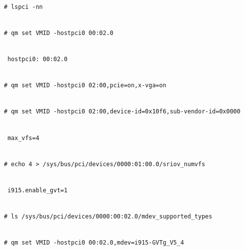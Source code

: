 \begin{lstlisting}

# lspci -nn

\end{lstlisting}

\begin{lstlisting}

# qm set VMID -hostpci0 00:02.0

\end{lstlisting}

\begin{lstlisting}

 hostpci0: 00:02.0

\end{lstlisting}

\begin{lstlisting}

# qm set VMID -hostpci0 02:00,pcie=on,x-vga=on

\end{lstlisting}

\begin{lstlisting}

# qm set VMID -hostpci0 02:00,device-id=0x10f6,sub-vendor-id=0x0000

\end{lstlisting}

\begin{lstlisting}

 max_vfs=4

\end{lstlisting}

\begin{lstlisting}

# echo 4 > /sys/bus/pci/devices/0000:01:00.0/sriov_numvfs

\end{lstlisting}

\begin{lstlisting}

 i915.enable_gvt=1

\end{lstlisting}

\begin{lstlisting}

# ls /sys/bus/pci/devices/0000:00:02.0/mdev_supported_types

\end{lstlisting}

\begin{lstlisting}

# qm set VMID -hostpci0 00:02.0,mdev=i915-GVTg_V5_4

\end{lstlisting}

